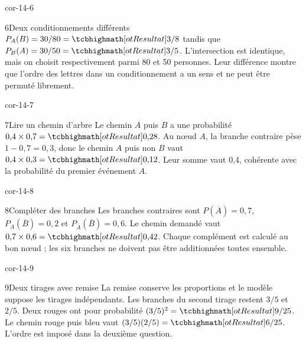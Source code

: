 \begin{blocLivre}{cor-14-6}
\begin{corrige}{6}{Deux conditionnements différents}
$P_A(B)=30/80=\res{3/8}$ tandis que $P_B(A)=30/50=\res{3/5}$. L’intersection est identique, mais on choisit respectivement parmi 80 et 50 personnes. Leur différence montre que l’ordre des lettres dans un conditionnement a un sens et ne peut être permuté librement.
\end{corrige}
\end{blocLivre}
\begin{blocLivre}{cor-14-7}
\begin{corrige}{7}{Lire un chemin d’arbre}
Le chemin $A$ puis $B$ a une probabilité $0{,}4\times0{,}7=\res{0{,}28}$. Au nœud $A$, la branche contraire pèse $1-0{,}7=0{,}3$, donc le chemin $A$ puis non $B$ vaut $0{,}4\times0{,}3=\res{0{,}12}$. Leur somme vaut 0,4, cohérente avec la probabilité du premier événement $A$.
\label{fig-cor-14-7}
\end{corrige}
\end{blocLivre}
\begin{blocLivre}{cor-14-8}
\begin{corrige}{8}{Compléter des branches}
Les branches contraires sont $P(\overline A)=0{,}7$, $P_A(\overline B)=0{,}2$ et $P_{\overline A}(\overline B)=0{,}6$. Le chemin demandé vaut $0{,}7\times0{,}6=\res{0{,}42}$. Chaque complément est calculé au bon nœud ; les six branches ne doivent pas être additionnées toutes ensemble.
\label{fig-cor-14-8}
\end{corrige}
\end{blocLivre}
\begin{blocLivre}{cor-14-9}
\begin{corrige}{9}{Deux tirages avec remise}
La remise conserve les proportions et le modèle suppose les tirages indépendants. Les branches du second tirage restent $3/5$ et $2/5$. Deux rouges ont pour probabilité $(3/5)^2=\res{9/25}$. Le chemin rouge puis bleu vaut $(3/5)(2/5)=\res{6/25}$. L’ordre est imposé dans la deuxième question.
\label{fig-cor-14-9}
\end{corrige}
\end{blocLivre}
